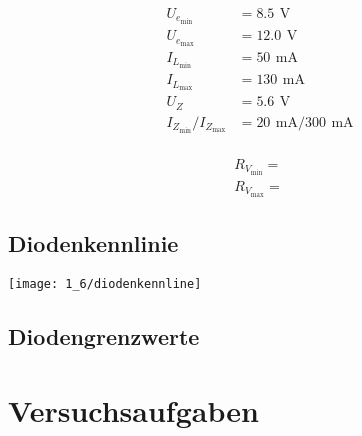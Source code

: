 \documentclass[a4paper, 12pt]{article}
\begin{document}
\begin{align*}
  U_{e_{\textrm{min}}} &= 8.5 \,\ \si{\volt}\\
  U_{e_{\textrm{max}}} &= 12.0 \,\ \si{\volt}\\
  I_{L_{\textrm{min}}} &= 50 \,\ \si{\milli\ampere}\\
  I_{L_{\textrm{max}}} &= 130 \,\ \si{\milli\ampere}\\
  U_{Z} &= 5.6 \,\ \si{\volt}\\
  I_{Z_{\textrm{min}}}/I_{Z_{\textrm{max}}} &= 20 \,\ \si{\milli\ampere} / 300 \,\ \si{\milli\ampere}\\
\end{align*}

\begin{gather*}
  R_{V_{\textrm{min}}} = \frac{}{}\\
  R_{V_{\textrm{max}}} = \frac{}{}
\end{gather*}

\subsection{Diodenkennlinie}

\begin{center}
  \texttt{[image: 1\_6/diodenkennline]}
\end{center}


\subsection{Diodengrenzwerte}


\pagebreak
\section{Versuchsaufgaben}

\end{document}

